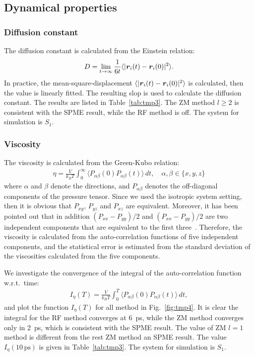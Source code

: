 \documentclass[aip,jcp,a4paper,preprint,unsortedaddress,onecolumn,fleqn]{revtex4-1}
\newcommand{\vect}[1]{\textbf{\textit{#1}}}
\newcommand{\systemsb}{S_1}
\begin{document}
\subsection{Dynamical properties}

\subsubsection{Diffusion constant}
The diffusion constant is calculated from the Einstein relation:
\begin{align}
  D = \lim_{t\rightarrow \infty}\frac {1}{6t} \langle \vert \vect r_i(t) - \vect r_i(0)\vert^2\rangle.
\end{align}
In practice, the mean-square-displacement $\langle\vert \vect r_i(t) - \vect
r_i(0)\vert^2\rangle$ is calculated, then the value is linearly fitted. The
resulting slop is used to calculate the diffusion constant. The results are listed in Table~\ref{tab:tmp3}.
The ZM method $l\geq 2$ is consistent with the SPME
result, while the RF method is off. The system for simulation is $\systemsb$.

\subsubsection{Viscosity}
The viscosity is calculated from the Green-Kubo relation:
\begin{align}
  \eta = \frac{V}{k_BT}\int_0^\infty\langle P_{\alpha\beta}(0) P_{\alpha\beta}(t)\rangle\,dt, \quad \alpha,\beta \in \{x, y, z\}
\end{align}
where $\alpha$ and $\beta$ denote the directions, and
$P_{\alpha\beta}$ denotes the off-diagonal components of the pressure
tensor. Since we used the isotropic system setting, then it is obvious
that $P_{xy}$, $P_{yz}$ and $P_{xz}$ are equivalent. Moreover, it has
been pointed out that in addition $(P_{xx} - P_{yy})/2$ and $(P_{xx} -
P_{yy})/2$ are two independent components that are equivalent to the
first three~\cite{alfe1998first}. Therefore, the viscosity is
calculated from the auto-correlation functions of five independent
components, and the statistical error is estimated from the standard
deviation of the viscosities calculated from the five components.

We investigate the convergence of the integral of the auto-correlation function w.r.t.~time:
\begin{align}
  I_\eta(T) = \frac{V}{k_BT}\int_0^T\langle P_{\alpha\beta}(0) P_{\alpha\beta}(t)\rangle\,dt,
\end{align}
and plot the function $I_\eta(T) $ for all method in
Fig.~\ref{fig:tmp4}.  It is clear the integral for the RF method
converges at 6~ps, while the ZM method converges only in 2~ps, which
is consistent with the SPME result.  The value of ZM $l=1$ method is
different from the rest ZM method an SPME result.  The value
$I_\eta(10\,\textrm{ps})$ is given in Table~\ref{tab:tmp3}.  The
system for simulation is $\systemsb$.
\end{document}
